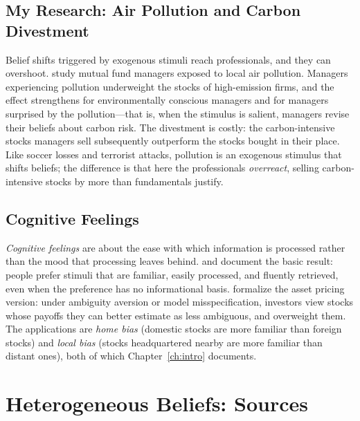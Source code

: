 \subsection{My Research: Air Pollution and Carbon Divestment}
\label{sec:myresearch_pollution}

Belief shifts triggered by exogenous stimuli reach professionals, and they can overshoot. \citet{huynh2025} study mutual fund managers exposed to local air pollution. Managers experiencing pollution underweight the stocks of high-emission firms, and the effect strengthens for environmentally conscious managers and for managers surprised by the pollution---that is, when the stimulus is salient, managers revise their beliefs about carbon risk. The divestment is costly: the carbon-intensive stocks managers sell subsequently outperform the stocks bought in their place. Like soccer losses and terrorist attacks, pollution is an exogenous stimulus that shifts beliefs; the difference is that here the professionals \emph{overreact}, selling carbon-intensive stocks by more than fundamentals justify.

\subsection{Cognitive Feelings}

\emph{Cognitive feelings} are about the ease with which information is processed rather than the mood that processing leaves behind. \citet{zajonc1968} and \citet{bornstein1989} document the basic result: people prefer stimuli that are familiar, easily processed, and fluently retrieved, even when the preference has no informational basis. \citet{uppal2003} formalize the asset pricing version: under ambiguity aversion or model misspecification, investors view stocks whose payoffs they can better estimate as less ambiguous, and overweight them. The applications are \emph{home bias} (domestic stocks are more familiar than foreign stocks) and \emph{local bias} (stocks headquartered nearby are more familiar than distant ones), both of which Chapter~\ref{ch:intro} documents.

\section{Heterogeneous Beliefs: Sources}
\label{sec:hetsources}

